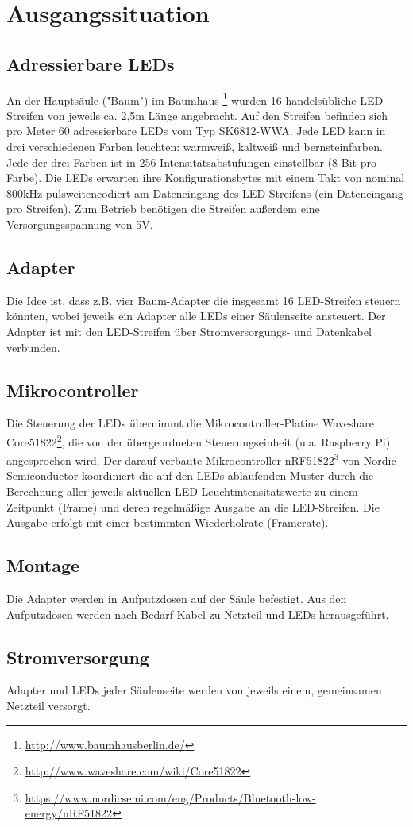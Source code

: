 
\section{Ausgangssituation}

\subsection{Adressierbare LEDs}
An der Haupts\"aule ("Baum") im
Baumhaus
\footnote{\url{http://www.baumhausberlin.de/}}
wurden
16
handels\"ubliche
LED-Streifen
von jeweils ca. 2,5m L\"ange angebracht.
Auf den Streifen befinden sich pro Meter
60 adressierbare LEDs vom Typ SK6812-WWA.
Jede LED kann in drei verschiedenen Farben leuchten:
warmwei{\ss}, kaltwei{\ss} und
bernsteinfarben.
Jede der drei Farben ist in
256 Intensit\"atsabstufungen einstellbar
(8 Bit pro Farbe).
Die LEDs erwarten ihre Konfigurationsbytes
mit einem Takt von nominal 800kHz
pulsweitencodiert
am Dateneingang des LED-Streifens
(ein Dateneingang pro Streifen).
Zum Betrieb ben\"otigen die Streifen au{\ss}erdem
eine Versorgungsspannung von 5V.

\subsection{Adapter}
Die Idee ist,
dass z.B. vier Baum-Adapter
die insgesamt
16 LED-Streifen
steuern k\"onnten,
wobei jeweils ein Adapter
alle LEDs
einer S\"aulenseite
ansteuert.
Der Adapter ist mit den LED-Streifen
\"uber Stromversorgungs- und Datenkabel verbunden.

\subsection{Mikrocontroller}
Die Steuerung der LEDs \"ubernimmt die
Mikrocontroller-Platine
Waveshare Core51822\footnote{\url{http://www.waveshare.com/wiki/Core51822}},
die von der \"ubergeordneten Steuerungseinheit
(u.a. Raspberry Pi)
angesprochen wird.
Der darauf verbaute Mikrocontroller
nRF51822\footnote{\url{https://www.nordicsemi.com/eng/Products/Bluetooth-low-energy/nRF51822}}
von Nordic Semiconductor
koordiniert die auf den LEDs ablaufenden Muster
durch die Berechnung aller jeweils aktuellen
LED-Leuchtintensit\"atswerte zu einem Zeitpunkt (Frame)
und deren regelm\"a{\ss}ige Ausgabe an die LED-Streifen.
Die Ausgabe erfolgt
mit einer bestimmten Wiederholrate (Framerate).

\subsection{Montage}
Die Adapter werden in Aufputzdosen
auf der S\"aule befestigt.
Aus den Aufputzdosen werden nach Bedarf
Kabel zu Netzteil und LEDs herausgef\"uhrt.

\subsection{Stromversorgung}
Adapter und LEDs jeder S\"aulenseite
werden von jeweils einem, gemeinsamen
Netzteil versorgt.

